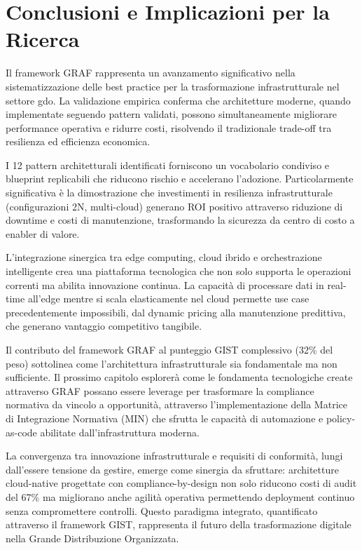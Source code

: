 \section{\texorpdfstring{Conclusioni e Implicazioni per la Ricerca}{3.8 - Conclusioni e Implicazioni per la Ricerca}}
\label{sec:cap3_conclusioni}

Il framework GRAF rappresenta un avanzamento significativo nella sistematizzazione delle best practice per la trasformazione infrastrutturale nel settore \gls{gdo}. La validazione empirica conferma che architetture moderne, quando implementate seguendo pattern validati, possono simultaneamente migliorare performance operativa e ridurre costi, risolvendo il tradizionale trade-off tra resilienza ed efficienza economica.

I 12 pattern architetturali identificati forniscono un vocabolario condiviso e blueprint replicabili che riducono rischio e accelerano l'adozione. Particolarmente significativa è la dimostrazione che investimenti in resilienza infrastrutturale (configurazioni 2N, multi-cloud) generano ROI positivo attraverso riduzione di downtime e costi di manutenzione, trasformando la sicurezza da centro di costo a enabler di valore.

L'integrazione sinergica tra edge computing, cloud ibrido e orchestrazione intelligente crea una piattaforma tecnologica che non solo supporta le operazioni correnti ma abilita innovazione continua. La capacità di processare dati in real-time all'edge mentre si scala elasticamente nel cloud permette use case precedentemente impossibili, dal dynamic pricing alla manutenzione predittiva, che generano vantaggio competitivo tangibile.

Il contributo del framework GRAF al punteggio GIST complessivo (32\% del peso) sottolinea come l'architettura infrastrutturale sia fondamentale ma non sufficiente. Il prossimo capitolo esplorerà come le fondamenta tecnologiche create attraverso GRAF possano essere leverage per trasformare la compliance normativa da vincolo a opportunità, attraverso l'implementazione della Matrice di Integrazione Normativa (MIN) che sfrutta le capacità di automazione e policy-as-code abilitate dall'infrastruttura moderna.

La convergenza tra innovazione infrastrutturale e requisiti di conformità, lungi dall'essere tensione da gestire, emerge come sinergia da sfruttare: architetture cloud-native progettate con compliance-by-design non solo riducono costi di audit del 67\% ma migliorano anche agilità operativa permettendo deployment continuo senza compromettere controlli. Questo paradigma integrato, quantificato attraverso il framework GIST, rappresenta il futuro della trasformazione digitale nella Grande Distribuzione Organizzata.

\clearpage
\printbibliography[
    heading=subbibliography,
    title={Riferimenti Bibliografici del Capitolo 3},
]

